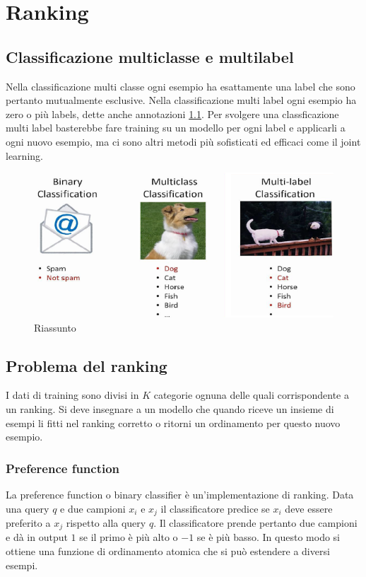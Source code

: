\chapter{Ranking}

\section{Classificazione multiclasse e multilabel}
Nella classificazione multi classe ogni esempio ha esattamente una label che sono pertanto mutualmente esclusive.
Nella classificazione multi label ogni esempio ha zero o pi\`u labels, dette anche annotazioni \ref{fig:chapter07-00}. 
Per svolgere una classficazione multi label basterebbe fare training su un modello per ogni label e applicarli a ogni nuovo esempio, ma ci sono altri metodi pi\`u sofisticati ed efficaci come il joint learning.

\begin{figure}
	\centering
	\includegraphics[width=0.6\linewidth]{imgs/chapter7/img0}
	\caption{Riassunto}
	\label{fig:chapter07-00}
\end{figure}

\section{Problema del ranking}
I dati di training sono divisi in $K$ categorie ognuna delle quali corrispondente a un ranking.
Si deve insegnare a un modello che quando riceve un insieme di esempi li fitti nel ranking corretto o ritorni un ordinamento per questo nuovo esempio.

	\subsection{Preference function}
	La preference function o binary classifier \`e un'implementazione di ranking.
	Data una query $q$ e due campioni $x_i$ e $x_j$ il classificatore predice se $x_i$ deve essere preferito a $x_j$ rispetto alla query $q$.
	Il classificatore prende pertanto due campioni e d\`a in output $1$ se il primo \`e pi\`u alto o $-1$ se \`e pi\`u basso.
	In questo modo si ottiene una funzione di ordinamento atomica che si pu\`o estendere a diversi esempi.

